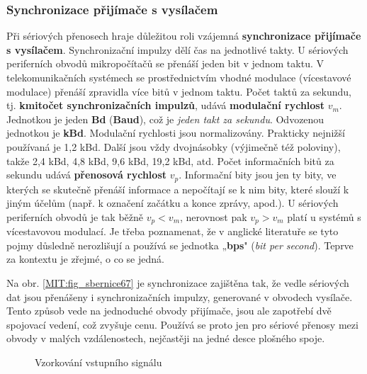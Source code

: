       \subsubsection{Synchronizace přijímače s vysílačem}
        Při sériových přenosech hraje důležitou roli vzájemná \textbf{synchronizace přijímače s
        vysílačem}. Synchronizační impulzy dělí čas na jednotlivé takty. U sériových periferních
        obvodů mikropočítačů se přenáší jeden bit v jednom taktu. V telekomunikačních systémech se
        prostřednictvím vhodné modulace (vícestavové modulace) přenáší zpravidla více bitů v jednom
        taktu. Počet taktů za sekundu, tj. \textbf{kmitočet synchronizačních impulzů}, udává
        \textbf{modulační rychlost} \(v_m\). Jednotkou je jeden \textbf{Bd} (\textbf{Baud}), což je
        \emph{jeden takt za sekundu}. Odvozenou jednotkou je \textbf{kBd}. Modulační rychlosti jsou
        normalizovány. Prakticky nejnižší používaná je 1,2 kBd. Další jsou vždy dvojnásobky
        (výjimečně též poloviny), takže 2,4 kBd, 4,8 kBd, 9,6 kBd, 19,2 kBd, atd. Počet informačních
        bitů za sekundu udává \textbf{přenosová rychlost} \(v_p\). Informační bity jsou jen ty bity,
        ve kterých se skutečně přenáší informace a nepočítají se k nim bity, které slouží k jiným
        účelům (např. k označení začátku a konce zprávy, apod.). U sériových periferních obvodů je
        tak běžně \(v_p < v_m\), nerovnost pak \(v_p > v_m\) platí u systémů s vícestavovou
        modulací. Je třeba poznamenat, že v anglické literatuře se tyto pojmy důsledně nerozlišují a
        používá se jednotka „\textbf{bps}" (\emph{bit per second}). Teprve za kontextu je zřejmé, o
        co se jedná.
        
        Na obr. \ref{MIT:fig_sbernice67} je synchronizace zajištěna tak, že vedle sériových dat 
        jsou přenášeny i synchronizačních impulzy, generované v obvodech vysílače. Tento způsob 
        vede na jednoduché obvody přijímače, jsou ale zapotřebí dvě spojovací vedení, což zvyšuje 
        cenu. Používá se proto jen pro sériové přenosy mezi obvody v malých vzdálenostech, 
        nejčastěji na jedné desce plošného spoje.
        
        \begin{figure}[ht!]
          \centering  
          \caption{Vzorkování vstupního signálu}
          \label{MIT:fig_sbernice6869}
        \end{figure}
        
